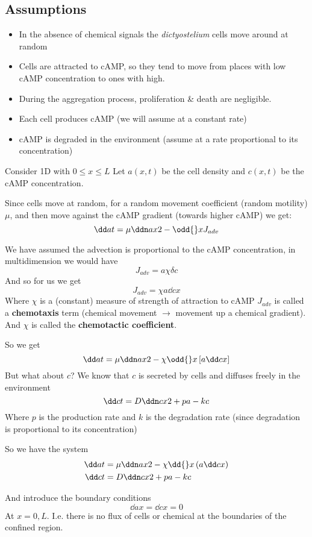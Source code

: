 \documentclass{X:/Documents/Coding/Latex/myassignment}
\begin{document}
\subsection{Assumptions}
\begin{itemize}
	\item In the absence of chemical signals the \textit{dictyostelium} cells move around at random
	\item Cells are attracted to cAMP, so they tend to move from places with low cAMP concentration to ones with high.
	\item During the aggregation process, proliferation \& death are negligible.
	\item Each cell produces cAMP (we will assume at a constant rate)
	\item cAMP is degraded in the environment (assume at a rate proportional to its concentration)
\end{itemize}
Consider 1D with $0\leq x \leq L$ 
Let $a(x,t)$ be the cell density and $c(x,t)$ be the cAMP concentration.

Since cells move at random, for a random movement coefficient (random motility) $\mu$, and then move against the cAMP gradient (towards higher cAMP) we get:
\[\dd at = \mu \ddn ax2 - \odd{}x J_{adv}\]

We have assumed the advection is proportional to the cAMP concentration, in multidimension we would have
\[J_{adv} = a\chi \delta c\]
And so for us we get
\[J_{adv} = \chi a \dd cx\]
Where $\chi$ is a (constant) measure of strength of attraction to cAMP
$J_{adv}$ is called a \textbf{chemotaxis} term (chemical movement $\rightarrow$ movement up a chemical gradient). And $\chi$ is called the \textbf{chemotactic coefficient}.


So we get
\[\dd at = \mu \ddn ax2 - \chi \odd{}x \left[a \dd cx\right]\]
But what about $c$?
We know that $c$ is secreted by cells and diffuses freely in the environment
\[\dd ct = D \ddn cx2 + pa - kc\]
Where $p$ is the production rate and $k$ is the degradation rate (since degradation is proportional to its concentration)

So we have the system
\begin{align*}
	\dd at &= \mu \ddn ax2 - \chi \dd{}x\left(a \dd cx\right) \\
	\dd ct &= D \ddn cx2 +pa - kc
\end{align*}

And introduce the boundary conditions
\[\dd ax = \dd cx = 0\]
At $x=0, L$. I.e. there is no flux of cells or chemical at the boundaries of the confined region.
\end{document}
